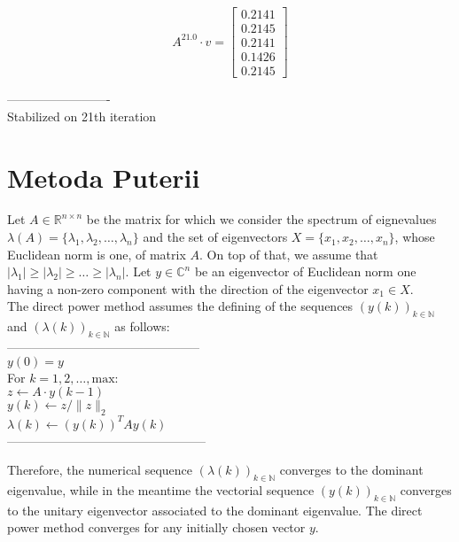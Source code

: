 \documentclass{article}
\begin{document}
      $$A^{21.0} \cdot v = \begin{bmatrix}
      0.2141\\
      0.2145\\
      0.2141\\
      0.1426\\
      0.2145
      \end{bmatrix}
      $$

-------------------------\\
Stabilized on 21th iteration


\section{Metoda Puterii}


Let $A \in \mathbb{R}^{n \times n}$ be the matrix for which we consider the spectrum of eignevalues $\lambda(A) = \{\lambda_1, \lambda_2, \ldots, \lambda_n\}$ and the set of eigenvectors $X = \{x_1, x_2, \ldots, x_n\}$, whose Euclidean norm is one, of matrix $A$. On top of that, we assume that $|\lambda_1| \geq |\lambda_2| \geq \ldots \geq |\lambda_n|$. Let $y \in \mathbb{C}^n$ be an eigenvector of Euclidean norm one having a non-zero component with the direction of the eigenvector $x_1 \in X$. \\


The direct power method assumes the defining of the sequences $(y(k))_{k \in \mathbb{N}}$ and $(\lambda(k))_{k \in \mathbb{N}}$ as follows: \\
----------------------------------------------- \\
$y(0) = y$ \\
For $k = 1, 2, \ldots, \text{{max}}$:\\
\hspace{1cm}$z \leftarrow A \cdot y(k-1)$\\
\hspace{1cm}$y(k) \leftarrow z / \|z\|_2$\\
\hspace{1cm}$\lambda(k) \leftarrow (y(k))^T A y(k)$ \\
------------------------------------------------

Therefore, the numerical sequence $(\lambda(k))_{k \in \mathbb{N}}$ converges to the dominant eigenvalue, while in the meantime the vectorial sequence $(y(k))_{k \in \mathbb{N}}$ converges to the unitary eigenvector associated to the dominant eigenvalue. The direct power method converges for any initially chosen vector $y$.
\end{document}
